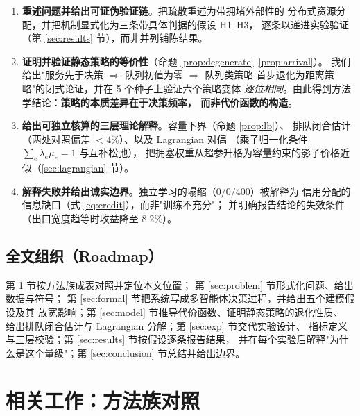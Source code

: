 \begin{csfcontrib}
\begin{enumerate}[label=\textbf{C\arabic*.}]
  \item \textbf{重述问题并给出可证伪验证链}。把疏散重述为带拥堵外部性的
        分布式资源分配，并把机制显式化为三条带具体判据的假设 H1--H3，
        逐条以递进实验验证（第 \ref{sec:results} 节），而非并列铺陈结果。
  \item \textbf{证明并验证静态策略的等价性}（命题 \ref{prop:degenerate}--\ref{prop:arrival}）。
        我们给出"服务先于决策 $\Rightarrow$ 队列初值为零 $\Rightarrow$ 队列类策略
        首步退化为距离策略"的闭式论证，并在 5 个种子上验证六个策略变体
        \emph{逐位相同}。由此得到方法学结论：\textbf{策略的本质差异在于决策频率，
        而非代价函数的构造}。
  \item \textbf{给出可独立核算的三层理论解释}。容量下界（命题 \ref{prop:lb}）、
        排队闭合估计（两处对照偏差 $<4\%$）、以及 Lagrangian 对偶
        （乘子归一化条件 $\sum_e\lambda_e\mu_e=1$ 与互补松弛），
        把拥塞权重从超参升格为容量约束的影子价格近似（\ref{sec:lagrangian} 节）。
  \item \textbf{解释失败并给出诚实边界}。独立学习的塌缩（$0/0/400$）被解释为
        信用分配的信息缺口（式 \eqref{eq:credit}），而非"训练不充分"；
        并明确报告结论的失效条件（出口宽度趋等时收益降至 $8.2\%$）。
\end{enumerate}
\end{csfcontrib}

\subsection{全文组织（Roadmap）}
\label{sec:roadmap}

第 \ref{sec:related} 节按方法族成表对照并定位本文位置；
第 \ref{sec:problem} 节形式化问题、给出数据与符号；
第 \ref{sec:formal} 节把系统写成多智能体决策过程，并给出五个建模假设及其
放宽影响；第 \ref{sec:model} 节推导代价函数、证明静态策略的退化性质、
给出排队闭合估计与 Lagrangian 分解；第 \ref{sec:exp} 节交代实验设计、
指标定义与三层校验；第 \ref{sec:results} 节按假设逐条报告结果，
并在每个实验后解释"为什么是这个量级"；第 \ref{sec:conclusion} 节总结并给出边界。

\section{相关工作：方法族对照}
\label{sec:related}


